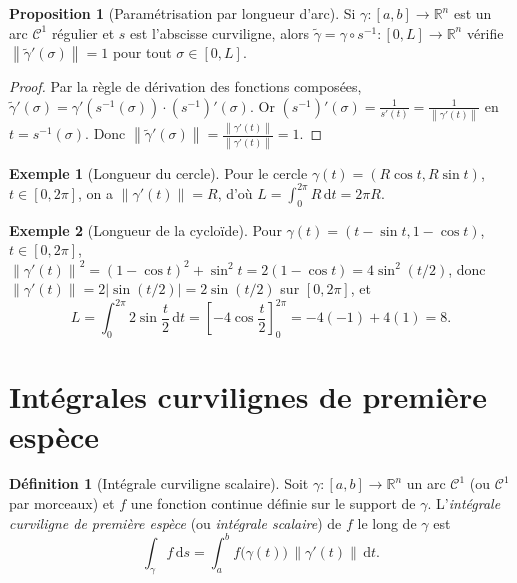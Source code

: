 \documentclass[12pt,a4paper,openany]{book}
\theoremstyle{definition}
\newtheorem{definition}{Définition}[chapter]
\newtheorem{proposition}{Proposition}[chapter]
\newtheorem{exemple}{Exemple}[chapter]
\newcommand{\R}{\mathbb{R}}
\newcommand{\abs}[1]{\left\lvert #1 \right\rvert}
\newcommand{\norm}[1]{\left\lVert #1 \right\rVert}
\newcommand{\dd}{\mathrm{d}}
\begin{document}
\begin{proposition}[Paramétrisation par longueur d'arc]
  \label{prop:param-longueur-arc}
  Si $\gamma\colon[a,b]\to\R^n$ est un arc $\mathcal{C}^1$ régulier et
  $s$ est l'abscisse curviligne, alors $\tilde{\gamma} = \gamma\circ s^{-1}
  \colon [0,L]\to\R^n$ vérifie
  $\norm{\tilde{\gamma}'(\sigma)} = 1$ pour tout $\sigma \in [0,L]$.
\end{proposition}

\begin{proof}
  Par la règle de dérivation des fonctions composées,
  $\tilde{\gamma}'(\sigma) = \gamma'(s^{-1}(\sigma))\cdot
  (s^{-1})'(\sigma)$.
  Or $(s^{-1})'(\sigma) = \frac{1}{s'(t)} = \frac{1}{\norm{\gamma'(t)}}$
  en $t = s^{-1}(\sigma)$. Donc
  $\norm{\tilde{\gamma}'(\sigma)} = \frac{\norm{\gamma'(t)}}
  {\norm{\gamma'(t)}} = 1$.
\end{proof}

\begin{exemple}[Longueur du cercle]\label{ex:longueur-cercle}
  Pour le cercle $\gamma(t) = (R\cos t, R\sin t)$, $t \in [0,2\pi]$,
  on a $\norm{\gamma'(t)} = R$, d'où
  $L = \int_0^{2\pi}R\,\dd t = 2\pi R$.
\end{exemple}

\begin{exemple}[Longueur de la cycloïde]\label{ex:longueur-cycloide}
  Pour $\gamma(t) = (t-\sin t, 1-\cos t)$, $t \in [0,2\pi]$,
  $\norm{\gamma'(t)}^2 = (1-\cos t)^2 + \sin^2 t = 2(1-\cos t)
  = 4\sin^2(t/2)$, donc $\norm{\gamma'(t)} = 2\abs{\sin(t/2)}
  = 2\sin(t/2)$ sur $[0,2\pi]$, et
  \[
    L = \int_0^{2\pi}2\sin\frac{t}{2}\,\dd t
    = \left[-4\cos\frac{t}{2}\right]_0^{2\pi} = -4(-1) + 4(1) = 8.
  \]
\end{exemple}



\section{Intégrales curvilignes de première espèce}
\label{sec:int-curv-premiere-espece}


\begin{definition}[Intégrale curviligne scalaire]\label{def:int-curv-scalaire}
  Soit $\gamma\colon[a,b]\to\R^n$ un arc $\mathcal{C}^1$ (ou
  $\mathcal{C}^1$ par morceaux) et $f$ une fonction continue définie
  sur le support de $\gamma$. L'\emph{intégrale curviligne de première
  espèce} (ou \emph{intégrale scalaire}) de $f$ le long de $\gamma$ est
  \begin{equation}\label{eq:int-curv-scalaire}
    \int_\gamma f\,\dd s
    = \int_a^b f\bigl(\gamma(t)\bigr)\,\norm{\gamma'(t)}\,\dd t.
  \end{equation}
\end{definition}
\end{document}

